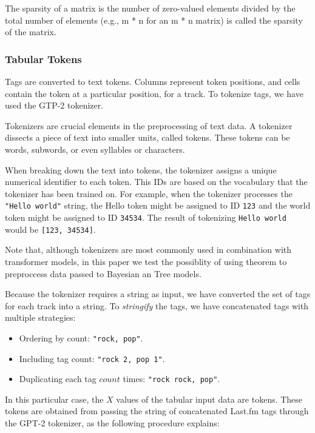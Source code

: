\documentclass[sn-mathphys]{sn-jnl}%
\theoremstyle{thmstyleone}%
\theoremstyle{thmstyletwo}%
\theoremstyle{thmstylethree}%
\begin{document}
The sparsity of a matrix is the number of zero-valued elements divided by the total number of elements
(e.g., m * n for an m * n matrix) is called the sparsity of the matrix.


\subsubsection{Tabular Tokens}

Tags are converted to text tokens. Columns represent token positions, and cells contain the token at a particular position, for a track.
To tokenize tags, we have used the GTP-2 tokenizer.

Tokenizers are crucial elements in the preprocessing of text data.
A tokenizer dissects a piece of text into smaller units, called tokens.
These tokens can be words, subwords, or even syllables or characters.

When breaking down the text into tokens, the tokenizer assigns a unique numerical identifier to each token.
This IDs are based on the vocabulary that the tokenizer has been trained on.
For example, when the tokenizer processes the \verb|"Hello world"| string, the Hello token might be assigned to ID \verb|123|
and the world token might be assigned to ID \verb|34534|.
The result of tokenizing \verb|Hello world| would be \verb|[123, 34534]|.

Note that, although tokenizers are most commonly used in combination with transformer models, in this paper we test the possiblity of using theorem
to preproccess data passed to Bayesian an Tree models.

Because the tokenizer requires a string as input, we have converted the set of tags for each track into a string.
To \emph{stringify} the tags, we have concatenated tags with multiple strategies:

\begin{itemize}
      \item Ordering by count: \verb|"rock, pop"|.
      \item Including tag count: \verb|"rock 2, pop 1"|.
      \item Duplicating each tag $count$ times: \verb|"rock rock, pop"|.
\end{itemize}


In this particular case, the $X$ values of the tabular input data are tokens.
These tokens are obtained from passing the string of concatenated Last.fm tags through the GPT-2 tokenizer,
as the following procedure explains:
\end{document}
